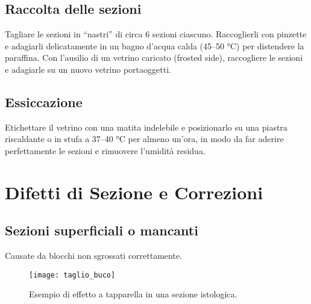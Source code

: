\subsection{Raccolta delle sezioni}

Tagliare le sezioni in “nastri” di circa 6 sezioni ciascuno. Raccoglierli con pinzette e adagiarli delicatamente in un bagno d'acqua calda (45–50 °C) per distendere la paraffina. Con l'ausilio di un vetrino caricato (frosted side), raccogliere le sezioni e adagiarle su un nuovo vetrino portaoggetti.


\subsection{Essiccazione}

Etichettare il vetrino con una matita indelebile e posizionarlo su una piastra riscaldante o in stufa a 37–40 °C per almeno un'ora, in modo da far aderire perfettamente le sezioni e rimuovere l'umidità residua.




\section{Difetti di Sezione e Correzioni}

\subsection{Sezioni superficiali o mancanti}
Causate da blocchi non sgrossati correttamente.
\begin{figure}[h]
\centering  
\texttt{[image: taglio\_buco]}
\caption{Esempio di effetto a tapparella in una sezione istologica.}
\end{figure}

